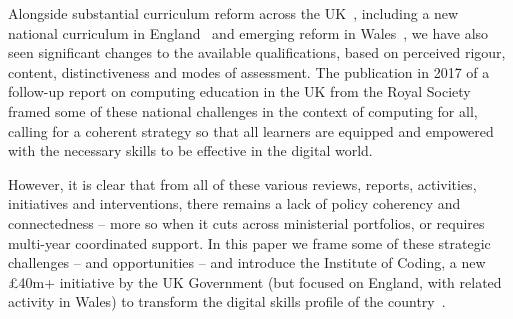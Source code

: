 \documentclass[conference]{IEEEtran}
\begin{document}
Alongside substantial curriculum reform across the
UK~\cite{brown-et-al:toce2014}, including a new national curriculum in
England~\cite{DfE2013a} and emerging reform in
Wales~\cite{moller+crick:jce2018}, we have also seen significant
changes to the available qualifications, based on perceived rigour,
content, distinctiveness and modes of assessment. The publication in
2017 of a follow-up report on computing education in the UK from the
Royal Society~\cite{rs:2017} framed some of these national challenges
in the context of computing for all, calling for a coherent strategy
so that all learners are equipped and empowered with the necessary
skills to be effective in the digital world.

However, it is clear that from all of these various reviews, reports,
activities, initiatives and interventions, there remains a lack of
policy coherency and connectedness -- more so when it cuts across
ministerial portfolios, or requires multi-year coordinated support. In
this paper we frame some of these strategic challenges -- and
opportunities -- and introduce the Institute of Coding, a new
\pounds40m+ initiative by the UK Government (but focused on England,
with related activity in Wales) to transform the digital skills
profile of the country~\cite{davenport-et-al:cep2019}.




\end{document}
